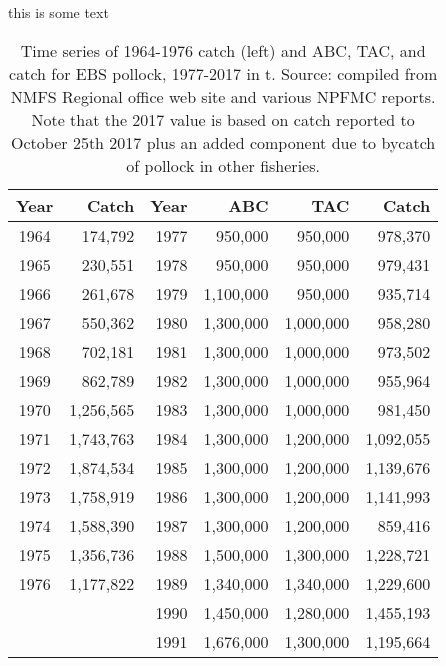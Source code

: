 \documentclass[]{article}
\author{}
\date{}
\begin{document}
	
%




\vskip 6.5pt


\noindent  this is some text

\begin{table}[ht]
\centering
\caption{Time series of 1964-1976 catch (left) and ABC, TAC, and catch for EBS pollock, 1977-2017 in t. Source: compiled from NMFS Regional office web site and various NPFMC reports. Note that the 2017 value is based on catch reported to October 25th 2017 plus an added component due to bycatch of pollock in other fisheries.}
\label{tab:samples}
\begin{tabular}{crrrrr}
\hline
Year    &   Catch   &   Year    &   ABC &   TAC &   Catch \\
\hline
1964    &   174,792 &   1977    &   950,000 &   950,000 &   978,370 \\
1965    &   230,551 &   1978    &   950,000 &   950,000 &   979,431 \\
1966    &   261,678 &   1979    &   1,100,000   &   950,000 &   935,714 \\
1967    &   550,362 &   1980    &   1,300,000   &   1,000,000   &   958,280 \\
1968    &   702,181 &   1981    &   1,300,000   &   1,000,000   &   973,502 \\
1969    &   862,789 &   1982    &   1,300,000   &   1,000,000   &   955,964 \\
1970    &   1,256,565   &   1983    &   1,300,000   &   1,000,000   &   981,450 \\
1971    &   1,743,763   &   1984    &   1,300,000   &   1,200,000   &   1,092,055 \\
1972    &   1,874,534   &   1985    &   1,300,000   &   1,200,000   &   1,139,676 \\
1973    &   1,758,919   &   1986    &   1,300,000   &   1,200,000   &   1,141,993 \\
1974    &   1,588,390   &   1987    &   1,300,000   &   1,200,000   &   859,416 \\
1975    &   1,356,736   &   1988    &   1,500,000   &   1,300,000   &   1,228,721 \\
1976    &   1,177,822   &   1989    &   1,340,000   &   1,340,000   &   1,229,600 \\
    &       &   1990    &   1,450,000   &   1,280,000   &   1,455,193 \\
    &       &   1991    &   1,676,000   &   1,300,000   &   1,195,664 \\

\end{tabular}
\end{table}
\end{document}
